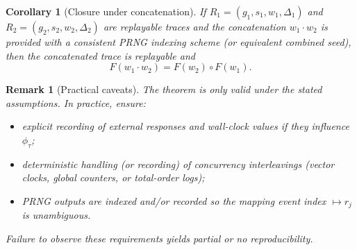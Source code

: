 \documentclass[11pt]{article}
\newtheorem{corollary}[definition]{Corollary}
\newtheorem{remark}[definition]{Remark}
\begin{document}
\begin{corollary}[Closure under concatenation]
If $R_1=(g_1,s_1,w_1,\Delta_1)$ and $R_2=(g_2,s_2,w_2,\Delta_2)$ are replayable traces and the concatenation $w_1\cdot w_2$ is provided with a consistent PRNG indexing scheme (or equivalent combined seed), then the concatenated trace is replayable and
\[
F(w_1\cdot w_2) = F(w_2)\circ F(w_1).
\]
\end{corollary}

\begin{remark}[Practical caveats]
The theorem is only valid under the stated assumptions. In practice, ensure:
\begin{itemize}
  \item explicit recording of external responses and wall-clock values if they influence $\phi_\tau$;
  \item deterministic handling (or recording) of concurrency interleavings (vector clocks, global counters, or total-order logs);
  \item PRNG outputs are indexed and/or recorded so the mapping event index $\mapsto r_j$ is unambiguous.
\end{itemize}
Failure to observe these requirements yields partial or no reproducibility.
\end{remark}
\end{document}
